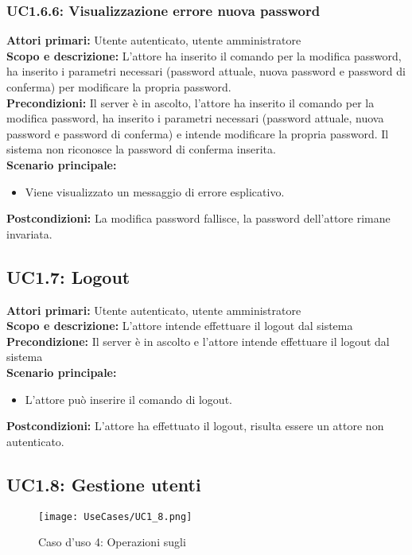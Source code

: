 \documentclass{scalatekids-article}
\begin{document}
\subsubsection{UC1.6.6: Visualizzazione errore nuova password}

\textbf{Attori primari:} Utente autenticato, utente amministratore\\
\textbf{Scopo e descrizione:}
L'attore ha inserito il comando per la modifica password, ha inserito i parametri necessari (password attuale, nuova password e password di conferma) per modificare la propria password.\\
\textbf{Precondizioni:} Il server è in ascolto, l'attore ha inserito il comando per la modifica password, ha inserito i parametri necessari (password attuale, nuova password e password di conferma) e intende modificare la propria password. Il sistema non riconosce la password di conferma inserita.\\
\textbf{Scenario principale:}
\begin{itemize}
\item Viene visualizzato un messaggio di errore esplicativo.
\end{itemize}
\textbf{Postcondizioni:} La modifica password fallisce, la password dell'attore rimane invariata.

\subsection{UC1.7: Logout}

\textbf{Attori primari:} Utente autenticato, utente amministratore\\
\textbf{Scopo e descrizione:} L'attore intende effettuare il logout dal sistema\\
\textbf{Precondizione:} Il server è in ascolto e l'attore intende effettuare il logout dal sistema\\
\textbf{Scenario principale:}
\begin{itemize}
\item L'attore può inserire il comando di logout.
\end{itemize}
\textbf{Postcondizioni:} L'attore ha effettuato il logout, risulta essere un attore non autenticato.

\subsection{UC1.8: Gestione utenti}

\begin{figure}[H]
  \begin{center}
    \texttt{[image: UseCases/UC1\_8.png]}
    \caption*{Caso d'uso 4: Operazioni sugli }
  \end{center}
\end{figure}
\end{document}
